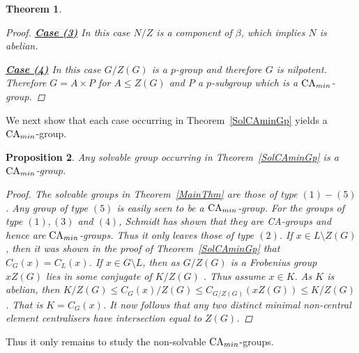 \documentclass[a4paper,11pt]{article}
\theoremstyle{plain}
\newtheorem{thm}{Theorem}[section]
\newtheorem{prop}[thm]{Proposition}
\numberwithin{thm}{section}
\begin{document}
\begin{thm}
\begin{proof}
\underline{\bf Case (3)}\newline
In this case $N/Z$ is a component of $\beta$, which implies $N$ is abelian.

\underline{\bf Case (4)}\newline
In this case $G/Z(G)$ is a $p$-group and therefore $G$ is nilpotent.
Therefore $G=A\times P$ for $A\leq Z(G)$ and $P$ a $p$-subgroup which is a ${\rm CA}_{min}$-group.
\end{proof}

\end{thm}

We next show that each case occurring in Theorem~\ref{SolCAminGp} yields a ${\rm CA}_{min}$-group. 

\begin{prop}\label{ListAreCAmin}
Any solvable group occurring in Theorem~\ref{SolCAminGp} is a ${\rm CA}_{min}$-group.
\begin{proof}
The solvable groups in Theorem~\ref{MainThm} are those of type $(1)-(5)$.
Any group of type $(5)$ is easily seen to be a ${\rm CA}_{min}$-group.
For the groups of type $(1),(3)$ and $(4)$, Schmidt \cite{SchmidtCaGps} has shown that they are CA-groups and hence are ${\rm CA}_{min}$-groups.
Thus it only leaves those of type $(2)$.
If $x\in L\setminus Z(G)$, then it was shown in the proof of Theorem~\ref{SolCAminGp} that $C_G(x)=C_L(x)$.
If $x \in G\setminus L$, then as $G/Z(G)$ is a Frobenius group $xZ(G)$ lies in some conjugate of $K/Z(G)$ \cite[Page 496]{Huppert}.
Thus assume $x\in K$.
As $K$ is abelian, then $K/Z(G)\leq C_G(x)/Z(G)\leq C_{G/Z(G)}(xZ(G))\leq K/Z(G)$.
That is $K=C_G(x)$.
It now follows that any two distinct minimal non-central element centralisers have intersection equal to $Z(G)$. 
\end{proof}
\end{prop}

Thus it only remains to study the non-solvable ${\rm CA}_{min}$-groups.
\end{document}
